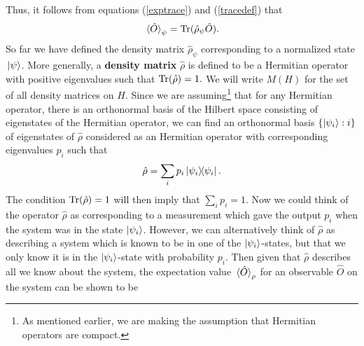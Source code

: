     Thus, it follows from equations (\ref{exptrace}) and (\ref{tracedef}) that 
    \begin{equation}
    \ev*{\hat{O}}_\psi=\Tr (\hat{\rho}_\psi\hat{O}\label{traceev}).
    \end{equation}
     So far we have defined the density matrix $\hat{\rho}_\psi$ corresponding to a normalized state $\ket*{\psi}$. More generally, a \textbf{density matrix} $\hat{\rho}$  %
% 
     is defined to be a Hermitian operator with positive eigenvalues such that $\operatorname{Tr}(\hat{\rho})=1.$ We will write $M(H)$   %
% 
for the set of all density matrices on $H$. Since we are assuming\footnote{As mentioned earlier, we are making the assumption that Hermitian operators are compact.} that for any Hermitian operator, there is an orthonormal basis of the Hilbert space consisting of eigenstates of the Hermitian operator, we can find an orthonormal basis $\{\ket{\psi_i}:i\}$ of eigenstates of $\hat{\rho}$ considered as an Hermitian operator with corresponding eigenvalues $p_i$ such that 
    \begin{equation}\label{rhodiag}
    \hat{\rho}=\sum_i p_i\dyad{\psi_i}.
    \end{equation} 
    The condition $\operatorname{Tr}(\hat{\rho})=1$ will then imply that $\sum_i p_i =1$. Now we could think of the operator $\hat{\rho}$ as corresponding to a measurement which gave the output $p_i$ when the system was in the state $\ket{\psi_i}$. However, we can alternatively think of $\hat{\rho}$ as describing a system which is known to be in one of the $\ket{\psi_i}$-states, but that we only know it is in the $\ket{\psi_i}$-state with probability $p_i$. Then given that $\hat{\rho}$ describes all we know about the system, the expectation value $\ev*{\hat{O}}_\rho$ for an observable $\hat{O}$ on the system can be shown to be    %
% 
